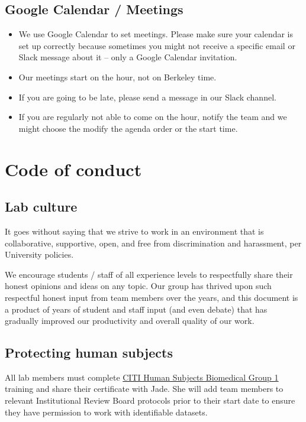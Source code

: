 \documentclass[]{book}
\providecommand{\tightlist}{%
  \setlength{\itemsep}{0pt}\setlength{\parskip}{0pt}}
\begin{document}
\section{Google Calendar / Meetings}\label{google-calendar-meetings}

\begin{itemize}
\tightlist
\item
  We use Google Calendar to set meetings. Please make sure your calendar
  is set up correctly because sometimes you might not receive a specific
  email or Slack message about it -- only a Google Calendar invitation.
\item
  Our meetings start on the hour, not on Berkeley time.
\item
  If you are going to be late, please send a message in our Slack
  channel.
\item
  If you are regularly not able to come on the hour, notify the team and
  we might choose the modify the agenda order or the start time.
\end{itemize}

\chapter{Code of conduct}\label{code-of-conduct}

\section{Lab culture}\label{lab-culture}

It goes without saying that we strive to work in an environment that is
collaborative, supportive, open, and free from discrimination and
harassment, per University policies.

We encourage students / staff of all experience levels to respectfully
share their honest opinions and ideas on any topic. Our group has
thrived upon such respectful honest input from team members over the
years, and this document is a product of years of student and staff
input (and even debate) that has gradually improved our productivity and
overall quality of our work.

\section{Protecting human subjects}\label{protecting-human-subjects}

All lab members must complete
\href{https://cphs.berkeley.edu/quickguideCITItraining.pdf}{CITI Human
Subjects Biomedical Group 1} training and share their certificate with
Jade. She will add team members to relevant Institutional Review Board
protocols prior to their start date to ensure they have permission to
work with identifiable datasets.
\end{document}
